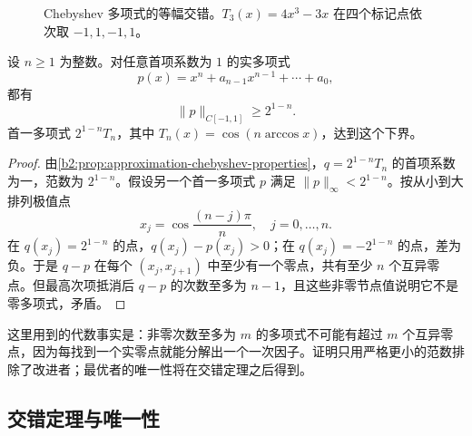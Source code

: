 \begin{figure}[htbp]
\centering
{}
\caption[Chebyshev 多项式的等幅交错]{Chebyshev 多项式的等幅交错。\(T_3(x)=4x^3-3x\) 在四个标记点依次取 \(-1,1,-1,1\)。}
\label{b2:fig:approximation-chebyshev-alternation}
\end{figure}

\begin{theorem}
\label{b2:thm:approximation-chebyshev-monic}
设 \(n\geq1\) 为整数。对任意首项系数为 \(1\) 的实多项式
\[
 p(x)=x^n+a_{n-1}x^{n-1}+\cdots+a_0,
\]
都有
\[
 \lVert p\rVert_{C[-1,1]}\geq2^{1-n}.
\]
首一多项式 \(2^{1-n}T_n\)，其中 \(T_n(x)=\cos(n\arccos x)\)，达到这个下界。
\end{theorem}
\begin{proof}
由\cref{b2:prop:approximation-chebyshev-properties}，\(q=2^{1-n}T_n\) 的首项系数为一，范数为 \(2^{1-n}\)。假设另一个首一多项式 \(p\) 满足 \(\lVert p\rVert_\infty<2^{1-n}\)。按从小到大排列极值点
\[
 x_j=\cos\frac{(n-j)\pi}{n},\quad j=0,\ldots,n.
\]
在 \(q(x_j)=2^{1-n}\) 的点，\(q(x_j)-p(x_j)>0\)；在 \(q(x_j)=-2^{1-n}\) 的点，差为负。于是 \(q-p\) 在每个 \((x_j,x_{j+1})\) 中至少有一个零点，共有至少 \(n\) 个互异零点。但最高次项抵消后 \(q-p\) 的次数至多为 \(n-1\)，且这些非零节点值说明它不是零多项式，矛盾。
\end{proof}

这里用到的代数事实是：非零次数至多为 \(m\) 的多项式不可能有超过 \(m\) 个互异零点，因为每找到一个实零点就能分解出一个一次因子。证明只用严格更小的范数排除了改进者；最优者的唯一性将在交错定理之后得到。

\subsection{交错定理与唯一性}
\label{b2:subsec:020803}

